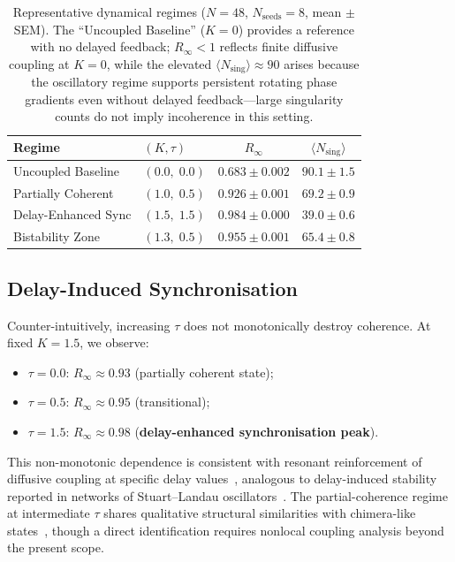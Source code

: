 \documentclass[11pt,a4paper]{article}
\begin{document}
\begin{table}[htbp]
\centering
\caption{%
  Representative dynamical regimes ($N=48$, $N_\text{seeds}=8$,
  mean $\pm$ SEM).
  The ``Uncoupled Baseline'' ($K=0$) provides a reference with
  no delayed feedback; $R_\infty < 1$ reflects finite
  diffusive coupling at $K=0$, while the elevated
  $\langle N_\text{sing}\rangle \approx 90$ arises because
  the oscillatory regime supports persistent rotating phase
  gradients even without delayed feedback---large singularity
  counts do not imply incoherence in this setting.%
}
\label{tab:regimes}
\begin{tabular}{@{}llcc@{}}
\toprule
\textbf{Regime} & \textbf{$(K,\tau)$} &
  $R_\infty$ & $\langle N_{\text{sing}}\rangle$ \\
\midrule
Uncoupled Baseline
  & $(0.0,\;0.0)$ & $0.683 \pm 0.002$ & $90.1 \pm 1.5$ \\
Partially Coherent
  & $(1.0,\;0.5)$ & $0.926 \pm 0.001$ & $69.2 \pm 0.9$ \\
Delay-Enhanced Sync
  & $(1.5,\;1.5)$ & $0.984 \pm 0.000$ & $39.0 \pm 0.6$ \\
Bistability Zone
  & $(1.3,\;0.5)$ & $0.955 \pm 0.001$ & $65.4 \pm 0.8$ \\
\bottomrule
\end{tabular}
\end{table}

\subsection{Delay-Induced Synchronisation}

Counter-intuitively, increasing $\tau$ does not monotonically
destroy coherence. At fixed $K = 1.5$, we observe:
\begin{itemize}
    \item $\tau = 0.0$: $R_\infty \approx 0.93$
          (partially coherent state);
    \item $\tau = 0.5$: $R_\infty \approx 0.95$
          (transitional);
    \item $\tau = 1.5$: $R_\infty \approx 0.98$
          (\textbf{delay-enhanced synchronisation peak}).
\end{itemize}
This non-monotonic dependence is consistent with resonant
reinforcement of diffusive coupling at specific delay
values~\cite{Yeung1999,Atay2004}, analogous to
delay-induced stability reported in networks of
Stuart--Landau oscillators~\cite{Nakamura1994}.
The partial-coherence regime at intermediate $\tau$ shares
qualitative structural similarities with chimera-like
states~\cite{Kuramoto2002,Abrams2004}, though a direct
identification requires nonlocal coupling analysis beyond
the present scope.
\end{document}
